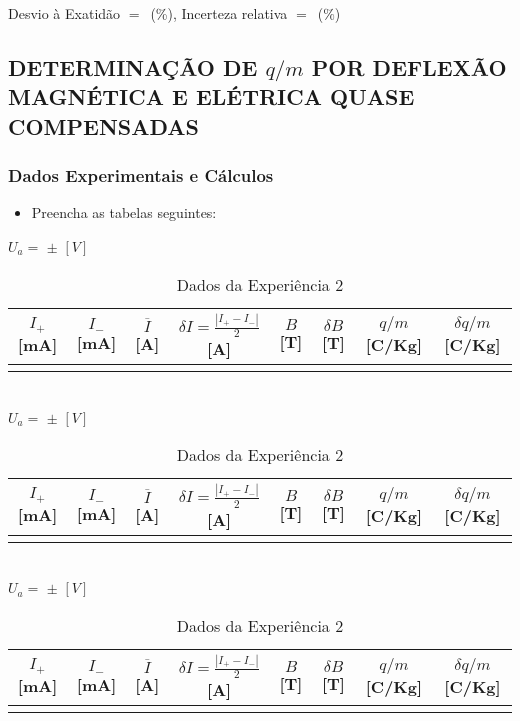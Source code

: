 \documentclass[a4paper,12pt]{article}  %
\begin{document}
\noindent  Desvio à Exatidão $=$~\underline{\makebox[1cm][r]{~}}(\%), 
Incerteza relativa $=$~\underline{\makebox[1cm][r]{~}}($\%$) 

\subsection{\sf DETERMINAÇÃO DE $q/m$ POR DEFLEXÃO\\ MAGNÉTICA E ELÉTRICA QUASE COMPENSADAS }

\subsubsection{\sf Dados Experimentais e Cálculos}

\begin{itemize}
\item Preencha as tabelas seguintes:
\end{itemize}
\begin{table}[!hbp]
	\centering
	\noindent	$U_a =$ \underline{\makebox[1.5cm][r]{~}} $\pm$ \underline{\makebox[1cm][r]{~}} $[V]$ \\
	\begin{tabular}{|c|c|c|c|c|c|c|c|}
	\hline
	 $I_+$ [mA] & $I_-$ [mA] & $\overline{I}$ [A]	& $\delta I = \frac{| I_+ - I_-|}{2}$ [A] & $B$ [T] & $\delta B$  [T] & $q/m$ [C/Kg] & $\delta q/m$ [C/Kg] \\
	\hline
	 &  &  & &  &  & & \\
	 \hline
 	\end{tabular}\\[10pt]
	\noindent	$U_a =$ \underline{\makebox[1.5cm][r]{~}} $\pm$ \underline{\makebox[1cm][r]{~}} $[V]$ \\
	\begin{tabular}{|c|c|c|c|c|c|c|c|}
	\hline
	 $I_+$ [mA] & $I_-$ [mA] & $\overline{I}$ [A]	& $\delta I = \frac{| I_+ - I_-|}{2}$ [A] & $B$ [T] & $\delta B$  [T] & $q/m$ [C/Kg] & $\delta q/m$ [C/Kg] \\
	\hline
	 &  &  & &  &  & & \\
	 \hline
 	\end{tabular}\\[10pt]
	\noindent	$U_a =$ \underline{\makebox[1.5cm][r]{~}} $\pm$ \underline{\makebox[1cm][r]{~}} $[V]$ \\
	\begin{tabular}{|c|c|c|c|c|c|c|c|}
	\hline
	 $I_+$ [mA] & $I_-$ [mA] & $\overline{I}$ [A]	& $\delta I = \frac{| I_+ - I_-|}{2}$ [A] & $B$ [T] & $\delta B$  [T] & $q/m$ [C/Kg] & $\delta q/m$ [C/Kg] \\
	\hline
	 &  &  & &  &  & & \\
	 \hline
 	\end{tabular}
	
	\caption{Dados da Experiência 2} 
	\label{tab:Dados2}
\end{table}
\end{document}
